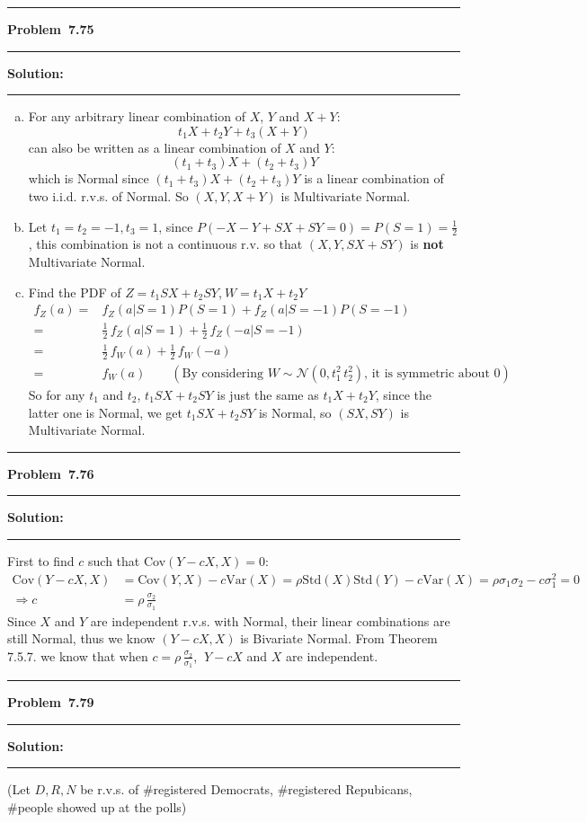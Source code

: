 \documentclass[10.5pt]{article}
\newcommand\question[1]{\vspace{.2in}\hrule\vspace{0.04in}\textbf{Problem\ #1}\vspace{.4em}\hrule\vspace{.10in}}
\newcommand\Solution{\vspace{.3in}\textbf{Solution:}\vspace{.5em}\hrule\vspace{.08in}\par}
\begin{document}
\question{7.75}
\Solution{}
\begin{enumerate}[(a)]
	\item For any arbitrary linear combination of $X$, $Y$ and $X+Y$:$$t_1X+t_2Y+t_3(X+Y)$$
	can also be written as a linear combination of $X$ and $Y$:$$(t_1+t_3)X+(t_2+t_3)Y$$
	which is Normal since $(t_1+t_3)X+(t_2+t_3)Y$ is a linear combination of two i.i.d. r.v.s. of Normal. So $(X, Y, X+Y)$ is Multivariate Normal.\vspace{1cm}
	\item Let $t_1 = t_2 = -1, t_3 = 1$, since $P(-X-Y+SX+SY = 0) = P(S = 1) = \frac{1}{2}$, this combination is not a continuous r.v. so that $(X, Y, SX+SY)$ is \textbf{not} Multivariate Normal.\vspace{1cm}
	\item Find the PDF of $Z = t_1SX+t_2SY$,$\ W=t_1X+t_2Y$\begin{align*}
		f_Z(a)=& f_Z(a|S = 1)P(S = 1)+f_Z(a|S = -1)P(S = -1)\\[8pt]
		=& \frac{1}{2}\, f_Z(a|S = 1)+\frac{1}{2}\, f_Z(-a|S = -1)\\[8pt]
		=& \frac{1}{2}\, f_W(a)+\frac{1}{2}\, f_W(-a)\\[8pt]
		=& f_W(a)\qquad(\text{By considering $W\sim\mathcal{N}(0, t_1^2\, t_2^2)$, it is symmetric about 0})
	\end{align*}
	So for any $t_1$ and $t_2$, $t_1SX+t_2SY$ is just the same as $t_1X+t_2Y$, since the latter one is Normal, we get $t_1SX+t_2SY$ is Normal, so $(SX, SY)$ is Multivariate Normal.
\end{enumerate}
\pagebreak
\question{7.76}
\Solution{}
First to find $c$ such that Cov$(Y-cX, X)=0$:
\begin{align*}
	\text{Cov}(Y-cX, X) &= \text{Cov}(Y,X)-c\text{Var}(X)=\rho\text{Std}(X)\text{Std}(Y)-c\text{Var}(X)=\rho\sigma_1\sigma_2-c\sigma_1^2 = 0\\[8pt]
	\Rightarrow c &= \rho\,\frac{\sigma_2}{\sigma_1}
\end{align*}
	Since $X$ and $Y$ are independent r.v.s. with Normal, their linear combinations are still Normal, thus we know $(Y-cX, X)$ is Bivariate Normal.
	From Theorem 7.5.7. we know that when $c = \rho\,\frac{\sigma_2}{\sigma_1}$, $\ Y-cX$ and $X$ are independent.\vspace{1cm}
\question{7.79}
\Solution{}
(Let $D, R, N$ be r.v.s. of \#registered Democrats, \#registered Repubicans, \#people showed up at the polls)
\end{document}

